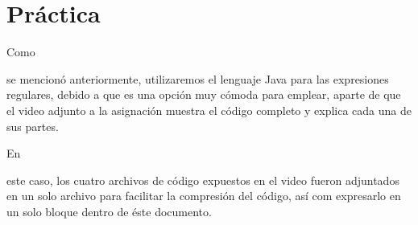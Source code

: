 \documentclass[stu, 12pt, letterpaper, donotrepeattitle, floatsintext, natbib]{apa7}
\begin{document}
\section{Práctica}
Como \begin{justifying}
se mencionó anteriormente, utilizaremos el lenguaje Java para las expresiones
    regulares, debido a que es una opción muy cómoda para emplear, aparte de que el video
    adjunto a la asignación muestra el código completo y explica cada una de sus partes.
\end{justifying}
En \begin{justifying}
    este caso, los cuatro archivos de código expuestos en el video fueron adjuntados
    en un solo archivo para facilitar la compresión del código, así com expresarlo 
    en un solo bloque dentro de éste documento.\par
\end{justifying}
\end{document}
